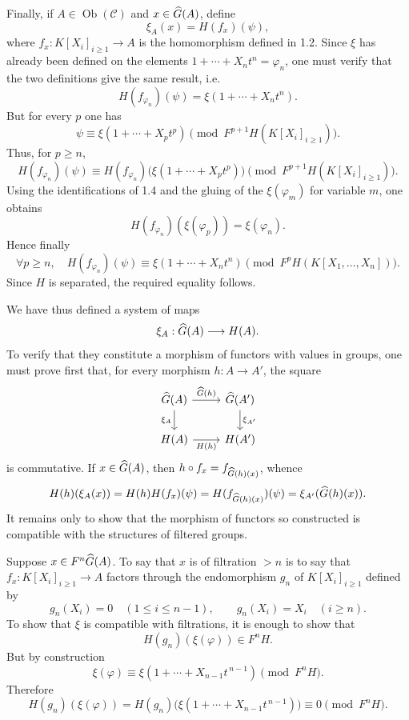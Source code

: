 \documentclass[11pt]{article}
\begin{document}
Finally, if \(A\in\operatorname{Ob}(\mathcal C)\) and \(x\in\widehat G(A)\), define
\[
  \xi_A(x)=H(f_x)(\psi),
\]
where \(f_x:K[X_i]_{i\geq 1}\to A\) is the homomorphism defined in 1.2. Since \(\xi\) has already been defined on the elements \(1+\cdots+X_nt^n=\varphi_n\), one must verify that the two definitions give the same result, i.e.
\[
  H(f_{\varphi_n})(\psi)=\xi(1+\cdots+X_nt^n).
\]
But for every \(p\) one has
\[
  \psi\equiv \xi(1+\cdots+X_pt^p)
  \pmod{F^{p+1}H(K[X_i]_{i\geq 1})}.
\]
Thus, for \(p\geq n\),
\[
  H(f_{\varphi_n})(\psi)
  \equiv
  H(f_{\varphi_n})\bigl(\xi(1+\cdots+X_pt^p)\bigr)
  \pmod{F^{p+1}H(K[X_i]_{i\geq 1})}.
\]
Using the identifications of 1.4 and the gluing of the \(\xi(\varphi_m)\) for variable \(m\), one obtains
\[
  H(f_{\varphi_n})(\xi(\varphi_p))=\xi(\varphi_n).
\]
Hence finally
\[
  \forall p\geq n,\quad
  H(f_{\varphi_n})(\psi)\equiv \xi(1+\cdots+X_nt^n)
  \pmod{F^pH(K[X_1,\ldots,X_n])}.
\]
Since \(H\) is separated, the required equality follows.

We have thus defined a system of maps
\[
  \xi_A:\widehat G(A)\longrightarrow H(A).
\]
To verify that they constitute a morphism of functors with values in groups, one must prove first that, for every morphism \(h:A\to A'\), the square
\[
\begin{tikzcd}
\Ghat(A) \arrow[r,"\Ghat(h)"] \arrow[d,"\xi_A"'] &
\Ghat(A') \arrow[d,"\xi_{A'}"]\\
H(A) \arrow[r,"H(h)"'] & H(A')
\end{tikzcd}
\]
is commutative. If \(x\in\widehat G(A)\), then \(h\circ f_x=f_{\widehat G(h)(x)}\), whence
\[
  H(h)(\xi_A(x))=H(h)H(f_x)(\psi)
  =H(f_{\widehat G(h)(x)})(\psi)=\xi_{A'}(\widehat G(h)(x)).
\]
It remains only to show that the morphism of functors so constructed is compatible with the structures of filtered groups.

Suppose \(x\in F^n\widehat G(A)\). To say that \(x\) is of filtration \(>n\) is to say that
\(f_x:K[X_i]_{i\geq 1}\to A\) factors through the endomorphism \(g_n\) of \(K[X_i]_{i\geq 1}\) defined by
\[
  g_n(X_i)=0\quad (1\leq i\leq n-1),\qquad
  g_n(X_i)=X_i\quad (i\geq n).
\]
To show that \(\xi\) is compatible with filtrations, it is enough to show that
\[
  H(g_n)(\xi(\varphi))\in F^nH.
\]
But by construction
\[
  \xi(\varphi)\equiv \xi(1+\cdots+X_{n-1}t^{\,n-1})
  \pmod{F^nH}.
\]
Therefore
\[
  H(g_n)(\xi(\varphi))
  =H(g_n)\bigl(\xi(1+\cdots+X_{n-1}t^{\,n-1})\bigr)
  \equiv 0\pmod{F^nH}.
\]
\end{document}
